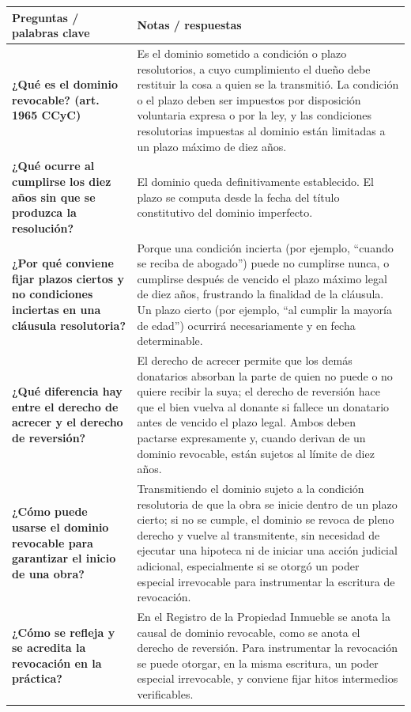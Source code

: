 \documentclass[12pt,oneside]{book}
\newlength{\cornellL}
\newlength{\cornellR}
\newcommand{\cornellrow}[2]{\textbf{#1} & #2 \\[0.3em] \midrule[0.3pt]}
\newcommand{\cornelllastrow}[2]{\textbf{#1} & #2 \\[0.3em]}
\begin{document}
\begingroup
\renewcommand{\arraystretch}{1.25}
\begin{longtable}{@{}>{\RaggedRight\arraybackslash}p{\cornellL}>{\RaggedRight\arraybackslash}p{\cornellR}@{}}
\toprule
\textbf{Preguntas / palabras clave} & \textbf{Notas / respuestas} \\
\midrule
\endhead

\cornellrow{¿Qué es el dominio revocable? (art. 1965 CCyC)}{Es el dominio sometido a condición o plazo resolutorios, a cuyo cumplimiento el dueño debe restituir la cosa a quien se la transmitió. La condición o el plazo deben ser impuestos por disposición voluntaria expresa o por la ley, y las condiciones resolutorias impuestas al dominio están limitadas a un plazo máximo de diez años.}

\cornellrow{¿Qué ocurre al cumplirse los diez años sin que se produzca la resolución?}{El dominio queda definitivamente establecido. El plazo se computa desde la fecha del título constitutivo del dominio imperfecto.}

\cornellrow{¿Por qué conviene fijar plazos ciertos y no condiciones inciertas en una cláusula resolutoria?}{Porque una condición incierta (por ejemplo, ``cuando se reciba de abogado'') puede no cumplirse nunca, o cumplirse después de vencido el plazo máximo legal de diez años, frustrando la finalidad de la cláusula. Un plazo cierto (por ejemplo, ``al cumplir la mayoría de edad'') ocurrirá necesariamente y en fecha determinable.}

\cornellrow{¿Qué diferencia hay entre el derecho de acrecer y el derecho de reversión?}{El derecho de acrecer permite que los demás donatarios absorban la parte de quien no puede o no quiere recibir la suya; el derecho de reversión hace que el bien vuelva al donante si fallece un donatario antes de vencido el plazo legal. Ambos deben pactarse expresamente y, cuando derivan de un dominio revocable, están sujetos al límite de diez años.}

\cornellrow{¿Cómo puede usarse el dominio revocable para garantizar el inicio de una obra?}{Transmitiendo el dominio sujeto a la condición resolutoria de que la obra se inicie dentro de un plazo cierto; si no se cumple, el dominio se revoca de pleno derecho y vuelve al transmitente, sin necesidad de ejecutar una hipoteca ni de iniciar una acción judicial adicional, especialmente si se otorgó un poder especial irrevocable para instrumentar la escritura de revocación.}

\cornelllastrow{¿Cómo se refleja y se acredita la revocación en la práctica?}{En el Registro de la Propiedad Inmueble se anota la causal de dominio revocable, como se anota el derecho de reversión. Para instrumentar la revocación se puede otorgar, en la misma escritura, un poder especial irrevocable, y conviene fijar hitos intermedios verificables.}


\end{longtable}
\end{document}
